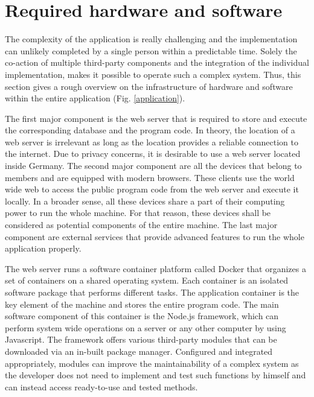 \documentclass[12pt,numbers=noenddot,parskip,bibliography=totocnumbered,listof=totocnumbered,draft]{scrreprt}
\begin{document}
\section{Required hardware and software}
The complexity of the application is really challenging and the implementation can unlikely completed by a single person within a predictable time. Solely the co-action of multiple third-party components and the integration of the individual implementation, makes it possible to operate such a complex system. Thus, this section gives a rough overview on the infrastructure of hardware and software within the entire application (Fig. \ref{application}).

The first major component is the web server that is required to store and execute the corresponding database and the program code. In theory, the location of a web server is irrelevant as long as the location provides a reliable connection to the internet. Due to privacy concerns, it is desirable to use a web server located inside Germany. The second major component are all the devices that belong to members and are equipped with modern browsers. These clients use the world wide web to access the public program code from the web server and execute it locally. In a broader sense, all these devices share a part of their computing power to run the whole machine. For that reason, these devices shall be considered as potential components of the entire machine. The last major component are external services that provide advanced features to run the whole application properly.

The web server runs a software container platform called \mbox{Docker} \citep{docker} that organizes a set of containers on a shared operating system. Each container is an isolated software package that performs different tasks. The application container is the key element of the machine and stores the entire program code. The main software component of this container is the \mbox{Node.js}\citep{nodejs} framework, which can perform system wide operations on a server or any other computer by using \mbox{Javascript}. The framework offers various third-party modules that can be downloaded via an in-built package manager. Configured and integrated appropriately, modules can improve the maintainability of a complex system as the developer does not need to implement and test such functions by himself and can instead access ready-to-use and tested methods.
\end{document}
